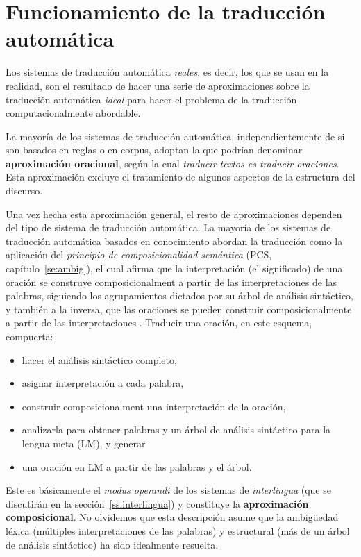\section{Funcionamiento de la traducción automática} \label{se:aprox} 

Los sistemas de traducción automática \emph{reales}, es decir, los que se usan en la realidad, son el resultado de hacer una serie de aproximaciones sobre la traducción automática \emph{ideal} para hacer el problema de la traducción computacionalmente abordable. 

La mayoría de los sistemas de traducción automática, independientemente de si son basados en reglas o en corpus, adoptan la que podrían denominar \textbf{aproximación oracional}, según la cual \emph{traducir textos es traducir oraciones}. Esta aproximación excluye el tratamiento de algunos aspectos de la estructura del discurso. 

Una vez hecha esta aproximación general, el resto de aproximaciones dependen del tipo de sistema de traducción automática. La mayoría de los sistemas de traducción automática basados en conocimiento abordan la traducción como la aplicación del \emph{principio de composicionalidad semántica} (PCS, capítulo~\ref{se:ambig}), el cual afirma que la interpretación (el significado) de una oración se construye composicionalment a partir de las interpretaciones de las palabras, siguiendo los agrupamientos dictados por su árbol de análisis sintáctico, y también a la inversa, que las oraciones se pueden construir composicionalmente a partir de las interpretaciones \citep{tellier00p}. Traducir una oración, en este esquema, compuerta: \begin{itemize} \item hacer el análisis sintáctico completo, \item asignar interpretación a cada palabra, \item construir composicionalment una interpretación de la oración, \item analizarla para obtener palabras y un árbol de análisis sintáctico para la lengua meta (LM), y generar \item una oración en LM a partir de las palabras y el árbol. \end{itemize} Este es básicamente el \emph{modus operandi} de los sistemas de \emph{interlingua} (que se discutirán en la sección~\ref{ss:interlingua}) y constituye la \textbf{aproximación composicional}. No olvidemos que esta descripción asume que la ambigüedad léxica (múltiples interpretaciones de las palabras) y estructural (más de un árbol de análisis sintáctico) ha sido idealmente resuelta. 

